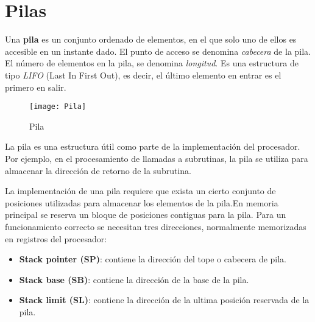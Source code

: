 \section{Pilas}\label{ap:pilas}

Una \textbf{pila} es un conjunto ordenado de elementos, en el que solo uno de ellos es accesible en un instante dado. El punto de acceso se denomina \textit{cabecera} de la pila. El número de elementos en la pila, se denomina \textit{longitud}. Es una estructura de tipo \textit{LIFO} (Last In First Out), es decir, el último elemento en entrar es el primero en salir.

\begin{figure}[h]
  \centering
  \texttt{[image: Pila]}
  \caption{Pila}
\end{figure}

La pila es una estructura útil como parte de la implementación del procesador. Por ejemplo, en el procesamiento de llamadas a subrutinas, la pila se utiliza para almacenar la dirección de retorno de la subrutina.

La implementación de una pila requiere que exista un cierto conjunto de posiciones utilizadas para almacenar los elementos de la pila.En memoria principal se reserva un bloque de posiciones contiguas para la pila.
Para un funcionamiento correcto se necesitan tres direcciones, normalmente memorizadas en registros del procesador:

\begin{itemize}
  \item \textbf{Stack pointer (SP)}: contiene la dirección del tope o cabecera de pila.
  \item \textbf{Stack base (SB)}: contiene la dirección de la base de la pila.
  \item \textbf{Stack limit (SL)}: contiene la dirección de la ultima posición reservada de la pila.
\end{itemize}